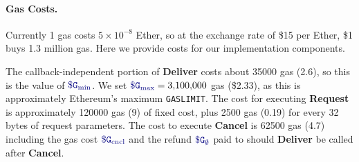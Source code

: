 
\paragraph{Gas Costs.}
Currently 1 gas costs $5 \times10^{-8}$ Ether, so at the exchange rate of \$15 per Ether, \$1 buys 1.3 million gas.
Here we provide costs for our implementation components.


The callback-independent portion of {\bf Deliver} costs about \num[group-separator={,}]{35000} gas (2.6\textcent), so this is the value of $\constgasmin$.
We set $\constgasmax = \num[group-separator={,}]{3100000}$ gas (\$2.33), as this is approximately Ethereum's maximum {\tt GASLIMIT}.
The cost for executing {\bf Request} is approximately \num[group-separator={,}]{120000} gas (9\textcent) of fixed cost, 
plus \num[group-separator={,}]{2500} gas (0.19\textcent) for every 32 bytes of request parameters.
The cost to execute {\bf Cancel} is 62500 gas (4.7\textcent)
including the gas cost $\constgasinvokecancel$ and the refund $\constgascancel$ paid to \tc should {\bf Deliver} be called after {\bf Cancel}.

